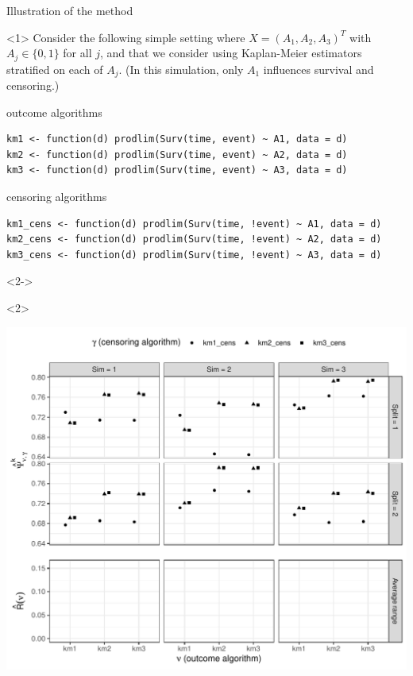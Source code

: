 \documentclass[smaller]{beamer}\usepackage{listings}
\begin{document}
\begin{frame}[label={sec:org532821c},fragile]{Illustration of the method}
 \begin{onlyenv}<1>
\small Consider the following simple setting where \(X=(A_1, A_2, A_3)^T\) with \(A_j \in \{0,1\}\)
for all \(j\), and that we consider using Kaplan-Meier estimators stratified on each of \(A_j\). (In
this simulation, only \(A_1\) influences survival and censoring.)

\vspace{.4cm}

\begin{block}{\centering outcome algorithms}
\lstset{language=r,label= ,caption= ,captionpos=b,numbers=none}
\begin{lstlisting}
km1 <- function(d) prodlim(Surv(time, event) ~ A1, data = d)
km2 <- function(d) prodlim(Surv(time, event) ~ A2, data = d)
km3 <- function(d) prodlim(Surv(time, event) ~ A3, data = d)
\end{lstlisting}
\end{block}

\begin{block}{\centering censoring algorithms}
\lstset{language=r,label= ,caption= ,captionpos=b,numbers=none}
\begin{lstlisting}
km1_cens <- function(d) prodlim(Surv(time, !event) ~ A1, data = d)
km2_cens <- function(d) prodlim(Surv(time, !event) ~ A2, data = d)
km3_cens <- function(d) prodlim(Surv(time, !event) ~ A3, data = d)
\end{lstlisting}
\end{block}
\end{onlyenv}

\begin{onlyenv}<2->
\begin{onlyenv}<2>
\begin{center}
\includegraphics[width=.9\linewidth]{fig-illustrate-fluct-risk.pdf}
\end{center}
\end{onlyenv}


\end{onlyenv}
\end{frame}
\end{document}
